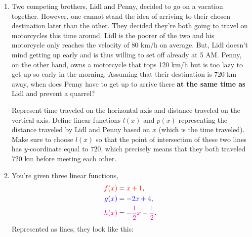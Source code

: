 \documentclass[a4paper,11pt]{article}
\newcommand{\tr}{\textcolor{red}}
\newcommand{\tb}{\textcolor{blue}}
\newcommand{\tm}{\textcolor{magenta}}
\begin{document}
\begin{enumerate}[topsep=0pt,label=\arabic*.]
 \item Two competing brothers, Lidl and Penny, decided to go on a vacation
  together. However, one cannot stand the idea of arriving to their chosen
  destination later than the other. They decided they're both going to travel on
  motorcycles this time around. Lidl is the poorer of the two and his motorcycle
  only reaches the velocity of 80 km/h on average. But, Lidl doesn't mind
  getting up early and is thus willing to set off already at 5 AM. Penny, on the
  other hand, owns a motorcycle that tops 120 km/h but is too lazy to get up so
  early in the morning. Assuming that their destination is 720 km away, when
  does Penny have to get up to arrive there \textbf{at the same time as} Lidl
  and prevent a quarrel?

  Represent time traveled on the horizontal axis and distance traveled on the
  vertical axis. Define linear functions $l(x)$ and $p(x)$ representing the
  distance traveled by Lidl and Penny based on $x$ (which is the time traveled).
  Make sure to choose $l(x)$ so that the point of intersection of these two
  lines has $y$-coordinate equal to $720$, which precisely means that they both
  traveled 720 km before meeting each other.

 \item You're given three linear functions,
  \begin{align*}
   \tr{f(x)} &= \tr{x + 1},\\
   \tb{g(x)} &= \tb{-2x + 4},\\
   \tm{h(x)} &= \tm{-\frac{1}{2}x - \frac{1}{2}}.
  \end{align*}
 Represented as lines, they look like this:
 \begin{center}
\end{center}
\end{enumerate}
\end{document}
